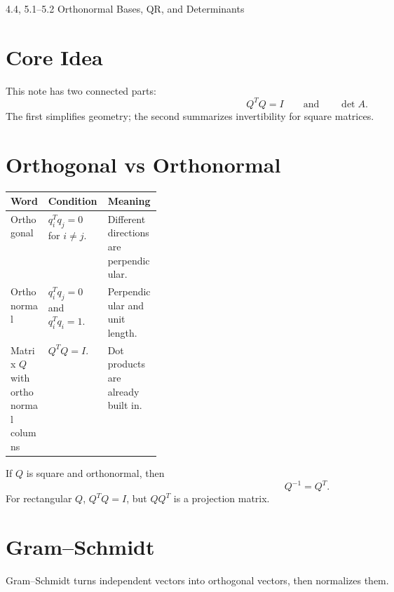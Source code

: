 \documentclass[10pt]{article}
\begin{document}
\begin{center}
{\LARGE 4.4, 5.1--5.2 Orthonormal Bases, QR, and Determinants\par}
\end{center}

\section{Core Idea}


This note has two connected parts:
\[
Q^{T}Q=I
\qquad\text{and}\qquad
\det A.
\]
The first simplifies geometry; the second summarizes invertibility for square matrices.

\section{Orthogonal vs Orthonormal}

\begin{center}
\small
\begin{tabularx}{\linewidth}{@{}L{0.25\linewidth}Y Y@{}}
\toprule
Word & Condition & Meaning \\
\midrule
Orthogonal & \(q_i^{T}q_j=0\) for \(i\ne j\). & Different directions are perpendicular. \\
Orthonormal & \(q_i^{T}q_j=0\) and \(q_i^{T}q_i=1\). & Perpendicular and unit length. \\
Matrix \(Q\) with orthonormal columns & \(Q^{T}Q=I\). & Dot products are already built in. \\
\bottomrule
\end{tabularx}
\end{center}

If \(Q\) is square and orthonormal, then
\[
Q^{-1}=Q^{T}.
\]
For rectangular \(Q\), \(Q^{T}Q=I\), but \(QQ^{T}\) is a projection matrix.

\section{Gram--Schmidt}

Gram--Schmidt turns independent vectors into orthogonal vectors, then normalizes them.
\end{document}

